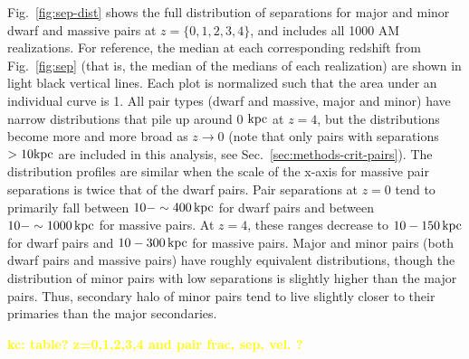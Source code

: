 \documentclass[twocolumn]{aastex631}
\newcommand{\kc}[1]{\textcolor{yellow}{\textbf{kc: #1}} }
\begin{document}
Fig.~\ref{fig:sep-dist} shows the full distribution of separations for major and minor dwarf and massive pairs at $z=\{0,1,2,3,4\}$, and includes all 1000 AM realizations. 
For reference, the median at each corresponding redshift from Fig.~\ref{fig:sep} (that is, the median of the medians of each realization) are shown in light black vertical lines.
Each plot is normalized such that the area under an individual curve is 1.
All pair types (dwarf and massive, major and minor) have narrow distributions that pile up around 0 $\mathrm{kpc}$ at $z=4$, but the distributions become more and more broad as $z\to0$ (note that only pairs with separations $>10\mathrm{kpc}$ are included in this analysis, see Sec.~\ref{sec:methods-crit-pairs}).
\linebreak
The distribution profiles are similar when the scale of the x-axis for massive pair separations is twice that of the dwarf pairs. 
Pair separations at $z=0$ tend to primarily fall between $10-\sim400\,\mathrm{kpc}$ for dwarf pairs and   between $10-\sim1000\,\mathrm{kpc}$ for massive pairs. 
At $z=4$, these ranges decrease to $10-150\,\mathrm{kpc}$ for dwarf pairs and $10-300\,\mathrm{kpc}$ for massive pairs. 
Major and minor pairs (both dwarf pairs and massive pairs) have roughly equivalent distributions, though the distribution of minor pairs with low separations is slightly higher than the major pairs. Thus, secondary halo of minor pairs tend to live slightly closer to their primaries than the  major secondaries.


\kc{table? z=0,1,2,3,4 and pair frac, sep, vel. ?}
\end{document}
